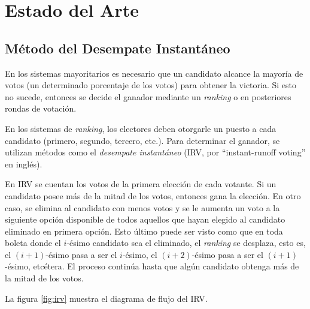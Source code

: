 \chapter{Estado del Arte}\label{chapter:state-of-the-art}

\section{M\'etodo del Desempate Instant\'aneo}
En los sistemas mayoritarios es necesario que un candidato alcance la mayor\'ia de votos (un determinado porcentaje de los votos) para obtener la victoria. Si esto no sucede, entonces se decide el ganador mediante un \textit{ranking} o en posteriores rondas de votaci\'on.

En los sistemas de \textit{ranking}, los electores deben otorgarle un puesto a cada candidato (primero, segundo, tercero, etc.).  Para determinar el ganador, se utilizan m\'etodos como el \textit{desempate instant\'aneo} (IRV, por ``instant-runoff voting'' en ingl\'es). 

En IRV se cuentan los votos de la primera elecci\'on de cada votante. Si un candidato posee m\'as de la mitad de  los votos, entonces gana la elecci\'on. En otro caso, se elimina al candidato con menos votos y se le aumenta un voto a la siguiente opci\'on disponible de todos aquellos que hayan elegido al candidato eliminado en primera opci\'on. Esto \'ultimo puede ser visto como que en toda boleta donde el $i$-\'esimo candidato sea el eliminado, el \textit{ranking} se desplaza, esto es, el $(i+1)$-\'esimo pasa a ser el $i$-\'esimo, el $(i+2)$-\'esimo pasa a ser el $(i+1)$-\'esimo, etc\'etera. El proceso contin\'ua hasta que alg\'un candidato obtenga m\'as de la mitad de los votos. 

La figura \ref{fig:irv} muestra el diagrama de flujo del IRV.

